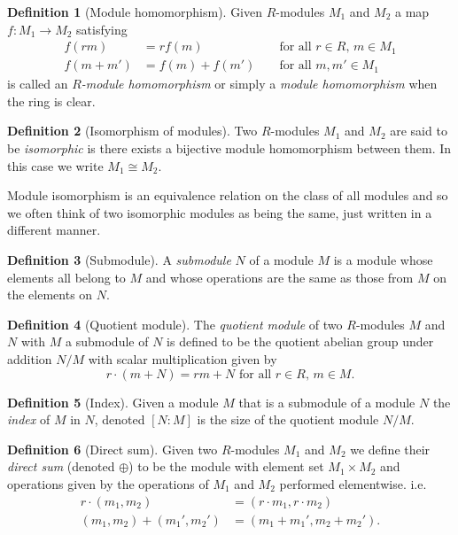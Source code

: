 \documentclass[a4paper,abstracton,bibtotoc]{scrreprt}
\theoremstyle{definition}
\newtheorem{defn}{Definition}
\begin{document}
\begin{defn}[Module homomorphism]
Given $R$-modules $M_1$ and $M_2$ a map $f\colon M_1 \to M_2$ satisfying
\begin{align*}
f(rm) &= rf(m) &&\text{ for all $r\in R$, $m\in M_1$}\\
f(m + m') &= f(m) + f(m')&&\text{ for all $m,m'\in M_1$}
\end{align*}
is called an \emph{$R$-module homomorphism} or simply a \emph{module homomorphism} when the ring is clear.
\end{defn}

\begin{defn}[Isomorphism of modules]
Two $R$-modules $M_1$ and $M_2$ are said to be \emph{isomorphic} is there exists a bijective module homomorphism between them. 
In this case we write $M_1\cong M_2$.
\end{defn}

Module isomorphism is an equivalence relation on the class of all modules and so we often think of two isomorphic modules as being the same, just written in a different manner.

\begin{defn}[Submodule]
A \emph{submodule} $N$ of a module $M$ is a module whose elements all belong to $M$ and whose operations are the same as those from $M$ on the elements on $N$.
\end{defn}

\begin{defn}[Quotient module]
The \emph{quotient module} of two $R$-modules $M$ and $N$ with $M$ a submodule of $N$ is defined to be the quotient abelian group under addition $N/
M$ with scalar multiplication given by
\[
r\cdot(m + N) = rm + N\text{ for all $r\in R$, $m\in M$}.
\]
\end{defn}

\begin{defn}[Index]
Given a module $M$ that is a submodule of a module $N$ the \emph{index} of $M$ in $N$, denoted $[N:M]$ is the size of the quotient module $N / M$.
\end{defn}

\begin{defn}[Direct sum]
Given two $R$-modules $M_1$ and $M_2$ we define their \emph{direct sum} (denoted $\oplus$) to be the module with element set $M_1 \times M_2$ and operations given by the operations of $M_1$ and $M_2$ performed elementwise. i.e.
\begin{align*}
r\cdot(m_1,m_2) &= (r\cdot m_1, r\cdot m_2)\\
(m_1,m_2) + (m_1',m_2') &= (m_1 + m_1',m_2+m_2').
\end{align*}
\end{defn}
\end{document}
